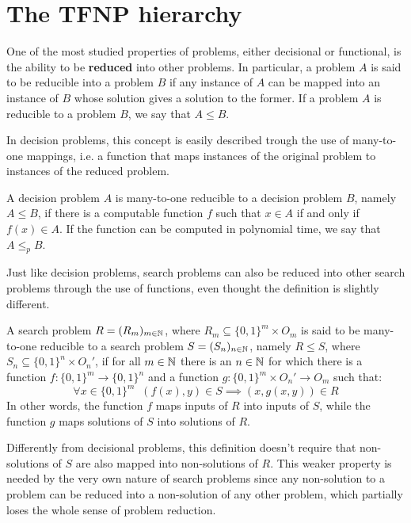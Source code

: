 \section{The \textsf{TFNP} hierarchy}

One of the most studied properties of problems, either decisional or functional, is the ability to be \textbf{reduced} into other problems. In particular, a problem $A$ is said to be reducible into a problem $B$ if any instance of $A$ can be mapped into an instance of $B$ whose solution gives a solution to the former. If a problem $A$ is reducible to a problem $B$, we say that $A \leq B$.

In decision problems, this concept is easily described trough the use of many-to-one mappings, i.e. a function that maps instances of the original problem to instances of the reduced problem. 

\begin{definition}
    A decision problem $A$ is many-to-one reducible to a decision problem $B$, namely $A \leq B$, if there is a computable function $f$ such that $x \in A$ if and only if $f(x) \in A$. If the function can be computed in polynomial time, we say that $A \leq_p B$.
\end{definition}

Just like decision problems, search problems can also be reduced into other search problems through the use of functions, even thought the definition is slightly different.

\begin{definition}
    A search problem $R = (R_m)_{m \in \mathbb{N}}$, where $R_m \subseteq \{0,1\}^m \times O_m$ is said to be many-to-one reducible to a search problem $S = (S_n)_{n \in \mathbb{N}}$, namely $R \leq S$, where $S_n \subseteq \{0,1\}^n \times O_n'$, if for all $m \in \mathbb{N}$ there is an $n \in \mathbb{N}$ for which there is a function $f : \{0,1\}^m \to \{0,1\}^n$ and a function $g : \{0,1\}^m \times O_n' \to O_m$ such that:
    \[\forall x \in \{0,1\}^m \;\; (f(x), y) \in S \implies (x, g(x,y)) \in R\]
    In other words, the function $f$ maps inputs of $R$ into inputs of $S$, while the function $g$ maps solutions of $S$ into solutions of $R$. 
\end{definition}

Differently from decisional problems, this definition doesn't require that non-solutions of $S$ are also mapped into non-solutions of $R$. This weaker property is needed by the very own nature of search problems since any non-solution to a problem can be reduced into a non-solution of any other problem, which partially loses the whole sense of problem reduction.

